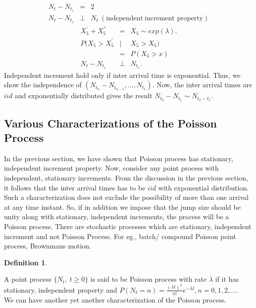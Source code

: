 \documentclass[11 pt]{article}
\theoremstyle{plain}
\theoremstyle{definition}
\newtheorem{defn}{Definition}[section]
\theoremstyle{remark}
\begin{document}
\begin{eqnarray*}
  N_t-N_{t_{1}} &=& 2 \\
  N_t-N_{t_{1}} &\perp& N_t  ~(\text{independent}~ \text{increment property})
\end{eqnarray*}
\begin{eqnarray*}
  X_{5}^{'}+ X_{5}^{''}&=& X_{5} \sim exp(\lambda). \\
  P (X_{5}>X_{5}^{'} &|& X_{5}>X_{5}) \\
   &=&  P (X_{5} > x) \\
   N_t-N_{t_{1}} &\perp& N_{t_{1}}. 
\end{eqnarray*}
Independent increment hold only if inter arrival time is exponential. Thus, we show the independence of $(N_{t_{n}}-N_{t_{n-1}},...,N_{t_{1}})$. Now, the inter arrival times are $iid$ and exponentially distributed gives the result  $N_{t_{2}}-N_{t_{1}} \sim N_{t_{2}-t_{1}}$. 
\subsection{Various Characterizations of the Poisson Process}

\noindent In the previous section, we have shown that Poisson process has stationary, independent increment property. Now, consider any point process with independent, stationary increments. From the discussion in the previous section, it follows that the inter arrival times has to be $iid$ with exponential distribution. Such a characterization does not exclude the possibility of more than one arrival at any time instant. So, if in addition we impose that the jump size should be unity along with stationary, independent increments, the process will be a Poisson process. There are stochastic processes which are stationary, independent increment and not Poisson Process. For eg., batch/ compound Poisson point process, Brownmans motion.
\begin{defn}
\end{defn}
 A point process $\{N_t,~t\geq 0\}$ is said to be Poisson process with rate $\lambda$ if it has stationary, independent property and $P (N_{t}=n)= \frac{(\lambda t)^{n}}{n!} e^{-\lambda t}, n=0,1,2,....$\\

We can have another yet another characterization of the Poisson process.
\end{document}
